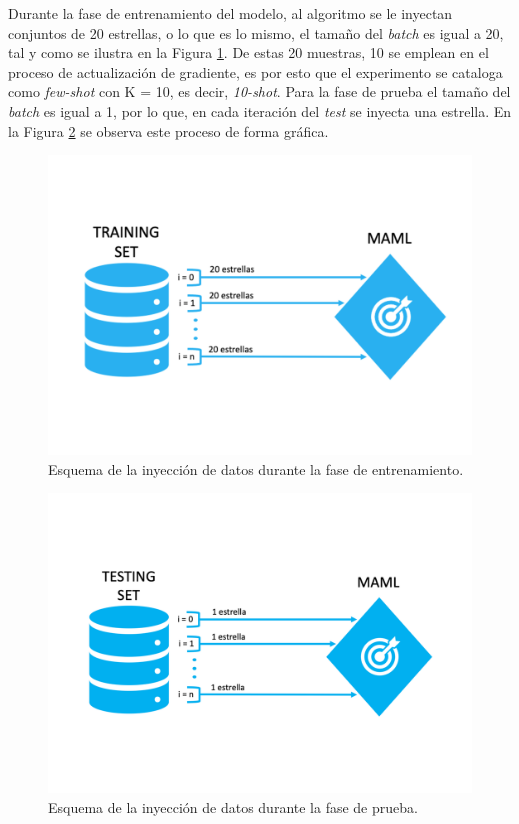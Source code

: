 Durante la fase de entrenamiento del modelo, al algoritmo se le inyectan conjuntos de 20 estrellas, o lo que es lo mismo, el tamaño del \emph{batch} es igual a 20, tal y como se ilustra en la Figura \ref{fig:input_data_train}. De estas 20 muestras, 10 se emplean en el proceso de actualización de gradiente, es por esto que el experimento se cataloga como \emph{few-shot} con K = 10, es decir, \emph{10-shot}. Para la fase de prueba el tamaño del \emph{batch} es igual a 1, por lo que, en cada iteración del \emph{test} se inyecta una estrella. En la Figura \ref{fig:input_data_test} se observa este proceso de forma gráfica.

\begin{figure}[H]
\begin{center}
 \includegraphics[width=0.8\linewidth]{Figuras/MAML/train_data.pdf}
\end{center}
\caption{Esquema de la inyección de datos durante la fase de entrenamiento.}
 \label{fig:input_data_train}
\end{figure}

\begin{figure}[H]
\begin{center}
 \includegraphics[width=0.8\linewidth]{Figuras/MAML/test_data.pdf}
\end{center}
\caption{Esquema de la inyección de datos durante la fase de prueba.}
 \label{fig:input_data_test}
\end{figure}


